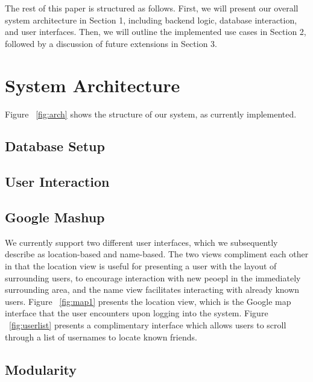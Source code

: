 \documentclass[11pt]{article}
\begin{document}
The rest of this paper is structured as follows. First, we will present our overall system architecture in Section 1, including backend logic, database interaction, and user interfaces. Then, we will outline the implemented use cases in Section 2, followed by a discussion of future extensions in Section 3.

\section{System Architecture}

Figure ~\ref{fig:arch} shows the structure of our system, as currently implemented. 


\subsection{Database Setup}


\subsection{User Interaction}


\subsection{Google Mashup}

We currently support two different user interfaces, which we subsequently describe as location-based and name-based. The two views compliment each other in that the location view is useful for presenting a user with the layout of surrounding users, to encourage interaction with new peoepl in the immediately surrounding area, and the name view facilitates interacting with already known users. Figure ~\ref{fig:map1} presents the location view, which is the Google map interface that the user encounters upon logging into the system. 
Figure ~\ref{fig:userlist} presents a complimentary interface which allows users to scroll through a list of usernames to locate known friends.

\subsection{Modularity}

\end{document}
